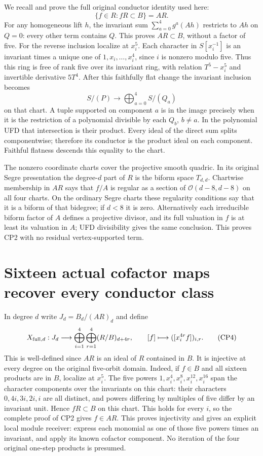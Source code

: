 \documentclass[11pt]{article}
\begin{document}
We recall and prove the full original conductor identity used here:
\[
 \{f\in R:fR\subset B\}=AR.                                      \tag{CP2}
\]
For any homogeneous lift $h$, the invariant sum
$\sum_{a=0}^4g^a(Ah)$ restricts to $Ah$ on $Q=0$: every other
term contains $Q$. This proves $AR\subset B$, without a factor
of five. For the reverse inclusion localize at $x_i^5$. Each
character in $S[x_i^{-1}]$ is an invariant times a unique one
of $1,x_i,\ldots,x_i^4$, since $i$ is nonzero modulo five.
Thus this ring is free of rank five over its invariant ring,
with relation $T^5-x_i^5$ and invertible derivative $5T^4$.
After this faithfully flat change the invariant inclusion becomes
\[
 S/(P)\longrightarrow\bigoplus_{a=0}^4 S/(Q_a)                    \tag{CP3}
\]
on that chart. A tuple supported on component $a$ is in the image
precisely when it is the restriction of a polynomial divisible by
each $Q_b$, $b\ne a$. In the polynomial UFD that intersection
is their product. Every ideal of the direct sum splits componentwise;
therefore its conductor is the product ideal on each component.
Faithful flatness descends this equality to the chart.

The nonzero coordinate charts cover the projective smooth quadric.
In its original Segre presentation the degree-$d$ part of $R$ is
the biform space $T_{d,d}$. Chartwise membership in $AR$ says
that $f/A$ is regular as a section of
$\mathcal O(d-8,d-8)$ on all four charts. On the ordinary Segre
charts these regularity conditions say that it is a biform of that
bidegree; if $d<8$ it is zero. Alternatively each irreducible
biform factor of $A$ defines a projective divisor, and its full
valuation in $f$ is at least its valuation in $A$; UFD divisibility
gives the same conclusion. This proves CP2 with no residual
vertex-supported term.

\section{Sixteen actual cofactor maps recover every conductor class}
In degree $d$ write $J_d=B_d/(AR)_d$ and define
\[
 X_{{\rm full},d}:J_d\longrightarrow
       \bigoplus_{i=1}^4\bigoplus_{r=1}^4(R/B)_{d+4r},\qquad
 [f]\longmapsto([x_i^{4r}f])_{i,r}.                                \tag{CP4}
\]
This is well-defined since $AR$ is an ideal of $R$ contained in $B$.
It is injective at every degree on the original five-orbit domain.
Indeed, if $f\in B$ and all sixteen products are in $B$, localize
at $x_i^5$. The five powers $1,x_i^4,x_i^8,x_i^{12},x_i^{16}$
span the character components over the invariants on this chart:
their characters $0,4i,3i,2i,i$ are all distinct, and powers differing
by multiples of five differ by an invariant unit. Hence $fR\subset B$
on this chart. This holds for every $i$, so the complete proof of
CP2 gives $f\in AR$. This proves injectivity and gives an explicit
local module receiver: express each monomial as one of those five
powers times an invariant, and apply its known cofactor component.
No iteration of the four original one-step products is presumed.
\end{document}
